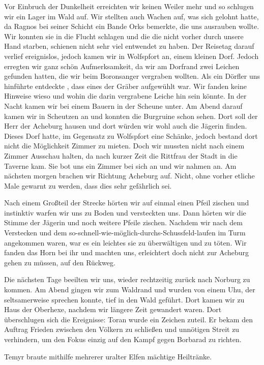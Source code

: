 Vor Einbruch der Dunkelheit erreichten wir keinen Weiler mehr und so schlugen wir ein Lager im Wald auf. Wir stellten auch Wachen auf, was sich gelohnt hatte, da Ragnos bei seiner Schicht ein Bande Orks bemerkte, die uns ausrauben wollte. Wir konnten sie in die Flucht schlagen und die die nicht vorher durch unsere Hand starben, schienen nicht sehr viel entwendet zu haben. Der Reisetag darauf verlief ereignislos, jedoch kamen wir in Wolfspfort an, einem kleinen Dorf. Jedoch erregten wir ganz schön Aufmerksamkeit, da wir am Dorfrand zwei Leichen gefunden hatten, die wir beim Boronsanger vergraben wollten. Als ein Dörfler uns hinführte entdeckte , dass eines der Gräber aufgewühlt war. Wir fanden keine Hinweise wieso und wohin die darin vergrabene Leiche hin sein könnte. In der Nacht kamen wir bei einem Bauern in der Scheune unter. Am Abend darauf kamen wir in Scheutzen an und konnten die Burgruine schon sehen. Dort soll der Herr der Acheburg hausen und dort würden wir wohl auch die Jägerin finden. Dieses Dorf hatte, im Gegensatz zu Wolfspfort eine Schänke, jedoch bestand dort nicht die Möglichkeit Zimmer zu mieten. Doch wir mussten nicht nach einem Zimmer Ausschau halten, da nach kurzer Zeit die Rittfrau der Stadt in die Taverne kam. Sie bot uns ein Zimmer bei sich an und wir nahmen an.
Am nächsten morgen brachen wir Richtung Acheburg auf. Nicht, ohne vorher etliche Male gewarnt zu werden, dass dies sehr gefährlich sei.\par
Nach einem Großteil der Strecke hörten wir auf einmal einen Pfeil zischen und instinktiv warfen wir uns zu Boden und versteckten uns. Dann hörten wir die Stimme der Jägerin und noch weitere Pfeile zischen.
Nachdem wir nach dem Verstecken und dem so-schnell-wie-möglich-durchs-Schussfeld-laufen im Turm angekommen waren, war es ein leichtes sie zu überwältigen und zu töten. Wir fanden das Horn bei ihr und machten uns, erleichtert doch nicht zur Acheburg gehen zu müssen, auf den Rückweg.\par
Die nächsten Tage beeilten wir uns, wieder rechtzeitig zurück nach Norburg zu kommen. Am Abend gingen wir zum Waldrand und wurden von einem Uhu, der seltsamerweise sprechen konnte, tief in den Wald geführt. Dort kamen wir zu Haus der Oberhexe, nachdem wir längere Zeit gewandert waren. Dort überschlugen sich die Ereignisse:
Toran wurde ein Zeichen zuteil. Er bekam den Auftrag Frieden zwischen den Völkern zu schließen und unnötigen Streit zu verhindern, um den Fokus einzig auf den Kampf gegen Borbarad zu richten.\par
Temyr braute mithilfe mehrerer uralter Elfen mächtige Heiltränke.\par
